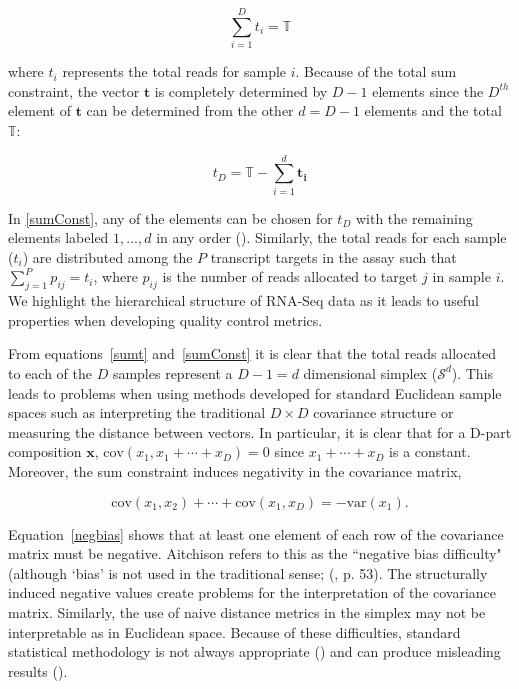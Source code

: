 \documentclass [10pt]{article}
\theoremstyle{definition}
\begin{document}
\begin{equation}
\sum_{i=1}^{D} t_i = \mathbb{T}
\label{sumt}
\end{equation}

where $t_i$ represents the total reads for sample $i$.  Because of the total sum constraint, the vector $\mathbf{t}$ is completely determined by $D-1$ elements since the $D^{th}$ element of $\mathbf{t}$ can be determined from the other $d = D-1$ elements and the total $\mathbb{T}$:  

\begin{equation}
t_D = \mathbb{T} - \sum_{i=1}^{d} \mathbf{t_i}
\label{sumConst}
\end{equation}

In \ref{sumConst}, any of the elements can be chosen for $t_D$ with the remaining elements labeled $1, ..., d$ in any order (\cite{Aitchison1986}).  Similarly, the total reads for each sample ($t_i$) are distributed among the $P$ transcript targets in the assay such that $\sum_{j=1}^{P} p_{ij} = t_i$, where $p_{ij}$ is the number of reads allocated to target $j$ in sample $i$.  We highlight the hierarchical structure of RNA-Seq data as it leads to useful properties when developing quality control metrics.


From equations~\ref{sumt} and~\ref{sumConst} it is clear that the total reads allocated to each of the $D$ samples represent a $D - 1 = d$ dimensional simplex ($\mathcal{S}^d$). This leads to problems when using methods developed for standard Euclidean sample spaces such as interpreting the traditional $D \times D$ covariance structure or measuring the distance between vectors.  In particular, it is clear that for a D-part composition $\mathbf{x}$, $\text{cov}(x_1, x_1+ \cdots +x_D) = 0$  since $x_1 + \cdots + x_D$ is a constant.  Moreover, the sum constraint induces negativity in the covariance matrix,

\begin{equation}
\text{cov}(x_1, x_2) + \cdots + \text{cov}(x_1, x_D) = -\text{var}(x_1).
\label{negbias}
\end{equation}

Equation~\ref{negbias} shows that at least one element of each row of the covariance matrix must be negative. Aitchison refers to this as the ``negative bias difficulty" (although `bias' is not used in the traditional sense; (\cite{Aitchison1986}, p. 53). The structurally induced negative values create problems for the interpretation of the covariance matrix.  Similarly, the use of naive distance metrics in the simplex may not be interpretable as in Euclidean space. Because of these difficulties, standard statistical methodology is not always appropriate (\cite{Aitchison1986}) and can produce misleading results (\cite{Lovell2015}).
\end{document}
